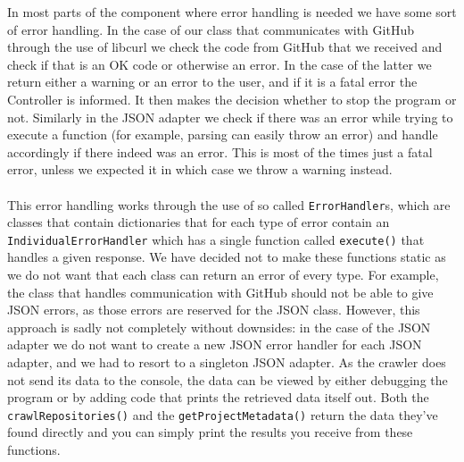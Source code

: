 \documentclass[../Main.tex]{subfiles}
\begin{document}
In most parts of the component where error handling is needed we have some sort of error handling. In the case of our class that communicates with GitHub through the use of libcurl we check the code from GitHub that we received and check if that is an OK code or otherwise an error. In the case of the latter we return either a warning or an error to the user, and if it is a fatal error the Controller is informed. It then makes the decision whether to stop the program or not. Similarly in the JSON adapter we check if there was an error while trying to execute a function (for example, parsing can easily throw an error) and handle accordingly if there indeed was an error. This is most of the times just a fatal error, unless we expected it in which case we throw a warning instead. \\
\\
This error handling works through the use of so called \texttt{ErrorHandler}s, which are classes that contain dictionaries that for each type of error contain an \texttt{IndividualErrorHandler} which has a single function called \texttt{execute()} that handles a given response. We have decided not to make these functions static as we do not want that each class can return an error of every type. For example, the class that handles communication with GitHub should not be able to give JSON errors, as those errors are reserved for the JSON class. However, this approach is sadly not completely without downsides: in the case of the JSON adapter we do not want to create a new JSON error handler for each JSON adapter, and we had to resort to a singleton JSON adapter.
\newpage
{}
As the crawler does not send its data to the console, the data can be viewed by either debugging the program or by adding code that prints the retrieved data itself out. Both the \texttt{crawlRepositories()} and the \texttt{getProjectMetadata()} return the data they've found directly and you can simply print the results you receive from these functions.
\end{document}
